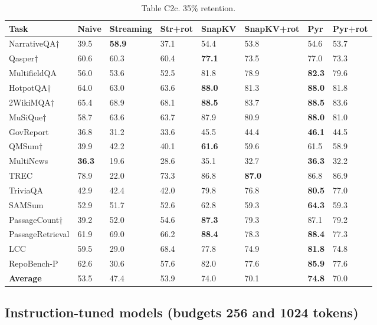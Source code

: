 \documentclass[10pt,letterpaper]{article}
\begin{document}
\begin{table}[H]
\centering
\small
\caption*{Table C2c. 35\% retention.}
\begin{tabular}{@{}llllllll@{}}
\toprule
Task & Naive & Streaming & Str+rot & SnapKV & SnapKV+rot & Pyr &
Pyr+rot\\
\midrule
    NarrativeQA† & 39.5 & \textbf{58.9} & 37.1 & 54.4 & 53.8 & 54.6 & 53.7\\
    Qasper† & 60.6 & 60.3 & 60.4 & \textbf{77.1} & 73.5 & 77.0 & 73.3\\
    MultifieldQA & 56.0 & 53.6 & 52.5 & 81.8 & 78.9 & \textbf{82.3} & 79.6\\
    HotpotQA† & 64.0 & 63.0 & 63.6 & \textbf{88.0} & 81.3 & \textbf{88.0} & 81.8\\
    2WikiMQA† & 65.4 & 68.9 & 68.1 & \textbf{88.5} & 83.7 & \textbf{88.5} & 83.6\\
    MuSiQue† & 58.7 & 63.6 & 63.7 & 87.9 & 80.9 & \textbf{88.0} & 81.0\\
    GovReport & 36.8 & 31.2 & 33.6 & 45.5 & 44.4 & \textbf{46.1} & 44.5\\
    QMSum† & 39.9 & 42.2 & 40.1 & \textbf{61.6} & 59.6 & 61.5 & 58.9\\
    MultiNews & \textbf{36.3} & 19.6 & 28.6 & 35.1 & 32.7 & \textbf{36.3} & 32.2\\
    TREC & 78.9 & 22.0 & 73.3 & 86.8 & \textbf{87.0} & 86.8 & 86.9\\
    TriviaQA & 42.9 & 42.4 & 42.0 & 79.8 & 76.8 & \textbf{80.5} & 77.0\\
    SAMSum & 52.9 & 51.7 & 52.6 & 62.8 & 59.3 & \textbf{64.3} & 59.3\\
    PassageCount† & 39.2 & 52.0 & 54.6 & \textbf{87.3} & 79.3 & 87.1 & 79.2\\
    PassageRetrieval & 61.9 & 69.0 & 66.2 & \textbf{88.4} & 78.3 & \textbf{88.4} & 77.3\\
    LCC & 59.5 & 29.0 & 68.4 & 77.8 & 74.9 & \textbf{81.8} & 74.8\\
    RepoBench-P & 62.6 & 30.6 & 57.6 & 82.0 & 77.6 & \textbf{85.9} & 77.6\\
    \textbf{Average} & 53.5 & 47.4 & 53.9 & 74.0 & 70.1 & \textbf{74.8} & 70.0\\
\bottomrule
\end{tabular}
\end{table}

\subsection*{Instruction-tuned models (budgets 256 and 1024 tokens)}
\end{document}
